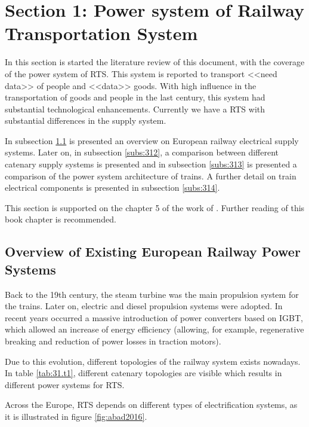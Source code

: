 




\section{Section 1: Power system of Railway Transportation System}


In this section is started the literature review of this document, with the coverage of the power system of \ac{RTS}. This system is reported to transport <<need data>> of people and <<data>> goods. With high influence in the transportation of goods and people in the last century, this system had substantial technological enhancements. Currently we have a \ac{RTS} with substantial differences in the supply system.

In subsection \ref{subs:311} is presented an overview on European railway electrical supply systems. Later on, in subsection \ref{subs:312}, a comparison between different catenary supply systems is presented and in subsection \ref{subs:313} is presented a comparison of the power system architecture of trains. A further detail on train electrical components is presented in subsection \ref{subs:314}.

This section is supported on the chapter 5 of the work of \cite{abad2016}. Further reading of this book chapter is recommended. 

\subsection{Overview of Existing European Railway Power Systems}
\label{subs:311}
Back to the 19th century, the steam turbine was the main propulsion system for the trains. Later on, electric and diesel propulsion systems were adopted. In recent years occurred a massive introduction of power converters based on \ac{IGBT}, which allowed an increase of energy efficiency (allowing, for example, regenerative breaking and reduction of power losses in traction motors).

Due to this evolution, different topologies of the railway system exists nowadays. In table \ref{tab:31.t1}, different catenary topologies are visible which results in different power systems for \ac{RTS}.




Across the Europe, \ac{RTS} depends on different types of electrification systems, as it is illustrated in figure \ref{fig:abad2016}.


